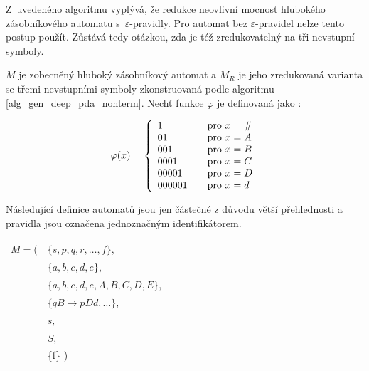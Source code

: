 Z~uvedeného algoritmu vyplývá, že redukce neovlivní mocnost hlubokého zásobníkového automatu s~$\varepsilon$-pravidly. Pro automat bez $\varepsilon$-pravidel nelze tento postup použít. Zůstává tedy otázkou, zda je též zredukovatelný na tři nevstupní symboly.


\newpage

\begin{Example}\label{example_symbol}
$M$ je zobecněný hluboký zásobníkový automat a $M_{R}$ je jeho zredukovaná varianta se třemi nevstupními symboly zkonstruovaná podle algoritmu \ref{alg_gen_deep_pda_nonterm}. Nechť funkce $\varphi$ je definovaná jako :

\[ \varphi(x) = \left\{
  \begin{array}{l l}
    1 & \quad \text{pro $x = \#$}\\
    01 & \quad \text{pro $x = A$}\\
    001 & \quad \text{pro $x = B$}\\
    0001 & \quad \text{pro $x = C$}\\
    00001 & \quad \text{pro $x = D$}\\
    000001 & \quad \text{pro $x = d$}
  \end{array} \right.\]

\medskip

Následující definice automatů jsou jen částečné z důvodu větší přehlednosti a pravidla jsou označena jednoznačným identifikátorem.
\bigskip

\setlength{\deftabcolsep}{\tabcolsep}
\setlength{\tabcolsep}{1pt}

\begin{tabular}{ll}

$M = ($&$\{s,p,q,r,\dots,f\},$ \\
     &$\{a,b,c,d,e\}, $\\
     &$\{a,b,c,d,e,A,B,C,D,E\},$ \\
     &$\{qB \rightarrow p Dd, \dots\},$\\
     &$s,$ \\
     &$S,$ \\
     &\{f\} )
\end{tabular}

\bigskip

\begin{tabular}{llp{12cm}l}


\end{tabular}
\end{Example}

